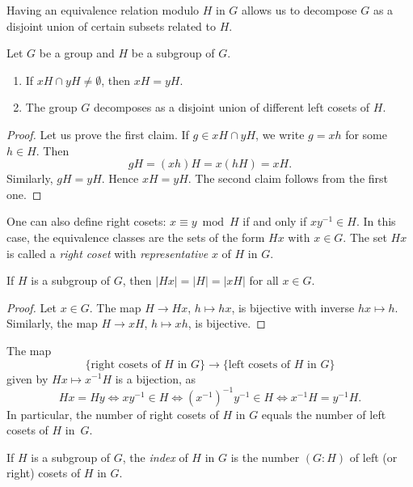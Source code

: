 Having an equivalence relation modulo $H$ in $G$ allows us to
decompose $G$ as a disjoint union of certain subsets related to $H$. 

\begin{proposition}
Let $G$ be a group and $H$ be a subgroup of $G$. 
\begin{enumerate}
\item If $xH\cap yH\ne\emptyset$, then $xH=yH$.
\item The group $G$ decomposes as a disjoint union 
of different left cosets of $H$.
\end{enumerate}
\end{proposition}

\begin{proof}
    Let us prove the first claim. If $g\in xH\cap yH$, we write 
    $g=xh$ for some $h\in H$. Then 
    \[
    gH=(xh)H=x(hH)=xH.
    \]
    Similarly, $gH=yH$. Hence $xH=yH$.
    The second claim follows from the first one. 
\end{proof}

One can also define right cosets: $x\equiv
y\bmod H$ if and only if $xy^{-1}\in H$. In this case, 
the equivalence classes are 
the sets of the form $Hx$ with $x\in G$. The set $Hx$ 
is called a \emph{right coset}
with \emph{representative} $x$ of $H$ in $G$. 

\begin{proposition}
    If $H$ is a subgroup of $G$, then  $|Hx|=|H|=|xH|$ for all $x\in G$.
\end{proposition}

\begin{proof}
    Let $x\in G$. The map $H\to Hx$, $h\mapsto hx$, is bijective 
    with inverse $hx\mapsto h$. Similarly, the map $H\to xH$,
    $h\mapsto xh$, is bijective.
\end{proof}

The map 
\[
        \{\text{right cosets of $H$ in $G$}\}\to\{\text{left cosets of $H$ in $G$}\}
\]
given by $Hx\mapsto x^{-1}H$ is a bijection, as 
\[
        Hx=Hy
        \Longleftrightarrow xy^{-1}\in H
        \Longleftrightarrow (x^{-1})^{-1}y^{-1}\in H
        \Longleftrightarrow x^{-1}H=y^{-1}H.
\]
In particular, the number of right cosets of $H$ in $G$
equals the number of left cosets of $H$ in~$G$. 

\begin{definition}
    If $H$ is a subgroup of $G$, the \emph{index} of $H$ in $G$
    is the number $(G:H)$ of left (or right) cosets of $H$ in $G$. 
\end{definition}

